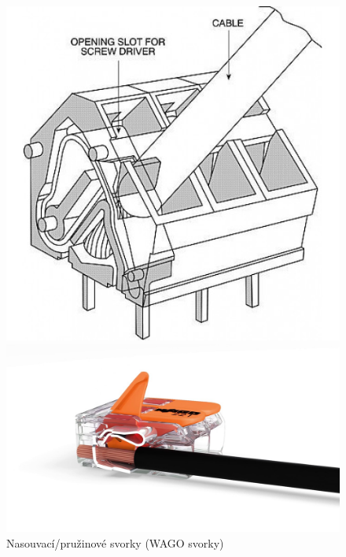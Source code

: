 \documentclass{article}
\begin{document}
\begin{figure}[H]
  \begin{minipage}[t]{0.35\textwidth}
    \centering
    \includegraphics[width=\textwidth]{vagoSvorka2.jpg}
  \end{minipage}
  \hfil
  \begin{minipage}[t]{0.65\textwidth}
    \centering
    \includegraphics[width=\textwidth]{vagoSvorka1.jpg}
  \end{minipage}
  \caption{Nasouvací/pružinové svorky (WAGO svorky)}
\end{figure}

\newpage
\end{document}
